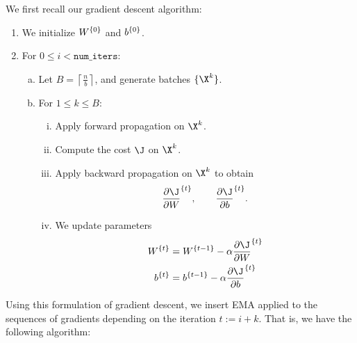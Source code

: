 We first recall our gradient descent algorithm:
\begin{enumerate}
	\item We initialize ${W}^{\{{0}\}}$ and ${b}^{\{{0}\}}$.
	\item For $0\leq i<\texttt{num\_iters}$:
		\begin{enumerate}[a.]
			\item Let $B=\left\lceil\frac{n}{b}\right\rceil$, and generate batches $\{\X^k\}$.
			\item For $1\leq k\leq B$:
			\begin{enumerate}[i.]
				\item Apply forward propagation on $\X^k$.
				\item Compute the cost $\J$ on $\X^k$.
				\item Apply backward propagation on $\X^k$ to obtain
				$$\iter{\frac{\partial\J}{\partial W}}{t},\qquad \iter{\frac{\partial\J}{\partial b}}{t}.$$
				\item We update parameters
				\begin{align*}
					\iter{W}{t}&=\iter{W}{t-1}-\alpha\iter{\frac{\partial\J}{\partial W}}{t}\\
					\iter{b}{t}&=\iter{b}{t-1}-\alpha\iter{\frac{\partial\J}{\partial b}}{t}
				\end{align*}
			\end{enumerate}
		\end{enumerate}
\end{enumerate}
Using this formulation of gradient descent, we insert EMA applied to the sequences of gradients depending on the iteration $t:=i+k$.  That is, we have the following algorithm:
